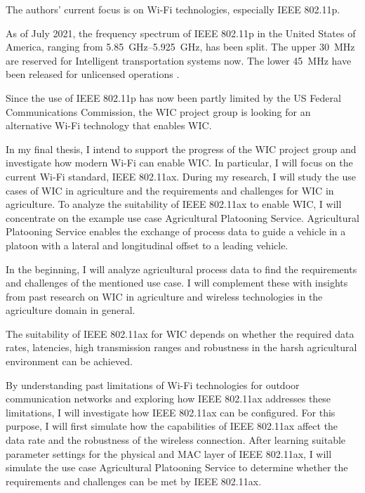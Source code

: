 The authors' current focus is on Wi-Fi technologies, especially IEEE 802.11p.

As of July 2021, the frequency spectrum of IEEE 802.11p in the United States of
America, ranging from \SIrange{5.85}{5.925}{\giga\hertz}, has been split.
The upper \SI{30}{\mega\hertz}
are reserved for Intelligent transportation systems now.
The lower \SI{45}{\mega\hertz} have
been released for unlicensed operations \cite{fcc_use_2021}. 

Since the use of IEEE 802.11p has now been partly limited by the  US Federal Communications Commission, the
WIC project group is looking for an alternative Wi-Fi technology that enables \ac{WIC}.

In my final thesis, I intend to support the progress of the \ac{WIC} project group and investigate how modern Wi-Fi can enable \ac{WIC}.
 In particular, I will focus on the current Wi-Fi standard, IEEE 802.11ax.
During my research, I will study the use cases of \ac{WIC} in agriculture and the requirements and challenges for \ac{WIC} in agriculture.
To analyze the suitability of IEEE 802.11ax to enable \ac{WIC}, I will concentrate on the example use case Agricultural Platooning Service.
Agricultural Platooning Service enables the exchange of process data
to guide a vehicle in a platoon with a lateral and longitudinal offset to a leading vehicle.

In the beginning, I will analyze agricultural process data to find the requirements and challenges of the mentioned use case.
I will complement these with insights from past research on \ac{WIC} in agriculture and wireless technologies
in the agriculture domain in general.

The suitability of IEEE 802.11ax for \ac{WIC} depends on whether the required data rates, latencies, high
transmission ranges and robustness in the harsh agricultural environment can be achieved.

By understanding past limitations of Wi-Fi technologies for outdoor communication networks
and exploring how IEEE 802.11ax addresses these limitations, I will investigate how IEEE 802.11ax can be configured.
For this purpose, I will first simulate how the capabilities of IEEE 802.11ax affect the data rate and the robustness of the wireless connection.
After learning suitable parameter settings for the physical and MAC layer of IEEE 802.11ax, I will simulate the use case
Agricultural Platooning Service to determine whether the requirements and challenges
can be met by IEEE 802.11ax.


